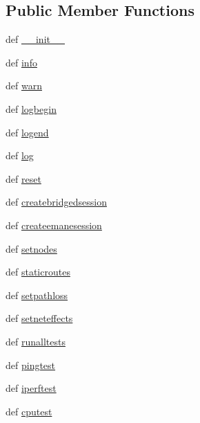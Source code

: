 \subsection*{Public Member Functions}
\begin{DoxyCompactItemize}
\item 
def \hyperlink{classwlanemanetests_1_1_experiment_a2219808c00e2d8a97aea13dbb28b2b0e}{\+\_\+\+\_\+init\+\_\+\+\_\+}
\item 
def \hyperlink{classwlanemanetests_1_1_experiment_aedec4064844d8abde9315e9f4a3334f3}{info}
\item 
def \hyperlink{classwlanemanetests_1_1_experiment_ab411c3f4a84f6f37393029724c79bcc0}{warn}
\item 
def \hyperlink{classwlanemanetests_1_1_experiment_a10a0b6f32cbb94f66aee62bfbdf48b77}{logbegin}
\item 
def \hyperlink{classwlanemanetests_1_1_experiment_a11a318649434b8ccf6831f61131b1bf3}{logend}
\item 
def \hyperlink{classwlanemanetests_1_1_experiment_a5b48a916cae49dd4db179663daa62697}{log}
\item 
def \hyperlink{classwlanemanetests_1_1_experiment_a718e070fa34b310f7de0e54c48f7af7a}{reset}
\item 
def \hyperlink{classwlanemanetests_1_1_experiment_aac5a8b2683779e7cb266fd302aaf5b03}{createbridgedsession}
\item 
def \hyperlink{classwlanemanetests_1_1_experiment_a56940dfb3e4a8f6fcd704d6106772c94}{createemanesession}
\item 
def \hyperlink{classwlanemanetests_1_1_experiment_ae098cb394cba006ef69a56819f90c7c3}{setnodes}
\item 
def \hyperlink{classwlanemanetests_1_1_experiment_a5889cd23dad8805320427704595833f0}{staticroutes}
\item 
def \hyperlink{classwlanemanetests_1_1_experiment_ad99cbf0e8d8a72a4902e9353a4a1ecd6}{setpathloss}
\item 
def \hyperlink{classwlanemanetests_1_1_experiment_ac51a9cabe5e42d817d487d02b166473f}{setneteffects}
\item 
def \hyperlink{classwlanemanetests_1_1_experiment_ab523075b111cc9eeb3f32c6f91077a5d}{runalltests}
\item 
def \hyperlink{classwlanemanetests_1_1_experiment_a9f29c6e916433099676ef4043e6386b6}{pingtest}
\item 
def \hyperlink{classwlanemanetests_1_1_experiment_aaa053057cde9a88d86189827474b33bc}{iperftest}
\item 
def \hyperlink{classwlanemanetests_1_1_experiment_a329693b65cbde47083632f79b15401e8}{cputest}
\end{DoxyCompactItemize}
